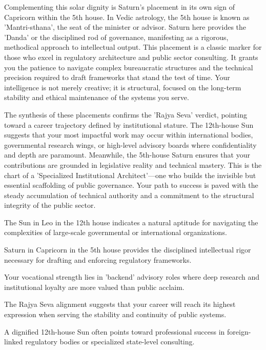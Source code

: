 {\fontsize{9}{13}\selectfont Complementing this solar dignity is Saturn's placement in its own sign of Capricorn within the 5th house. In Vedic astrology, the 5th house is known as 'Mantri-sthana', the seat of the minister or advisor. Saturn here provides the 'Danda' or the disciplined rod of governance, manifesting as a rigorous, methodical approach to intellectual output. This placement is a classic marker for those who excel in regulatory architecture and public sector consulting. It grants you the patience to navigate complex bureaucratic structures and the technical precision required to draft frameworks that stand the test of time. Your intelligence is not merely creative; it is structural, focused on the long-term stability and ethical maintenance of the systems you serve.}\par\vspace{1.8mm}

{\fontsize{9}{13}\selectfont The synthesis of these placements confirms the 'Rajya Seva' verdict, pointing toward a career trajectory defined by institutional stature. The 12th-house Sun suggests that your most impactful work may occur within international bodies, governmental research wings, or high-level advisory boards where confidentiality and depth are paramount. Meanwhile, the 5th-house Saturn ensures that your contributions are grounded in legislative reality and technical mastery. This is the chart of a 'Specialized Institutional Architect'---one who builds the invisible but essential scaffolding of public governance. Your path to success is paved with the steady accumulation of technical authority and a commitment to the structural integrity of the public sector.}\par\vspace{1.8mm}

\begin{diamondlist}
  \item {\fontsize{8.5}{12}\selectfont The Sun in Leo in the 12th house indicates a natural aptitude for navigating the complexities of large-scale governmental or international organizations.}
  \item {\fontsize{8.5}{12}\selectfont Saturn in Capricorn in the 5th house provides the disciplined intellectual rigor necessary for drafting and enforcing regulatory frameworks.}
  \item {\fontsize{8.5}{12}\selectfont Your vocational strength lies in 'backend' advisory roles where deep research and institutional loyalty are more valued than public acclaim.}
  \item {\fontsize{8.5}{12}\selectfont The Rajya Seva alignment suggests that your career will reach its highest expression when serving the stability and continuity of public systems.}
  \item {\fontsize{8.5}{12}\selectfont A dignified 12th-house Sun often points toward professional success in foreign-linked regulatory bodies or specialized state-level consulting.}
\end{diamondlist}

